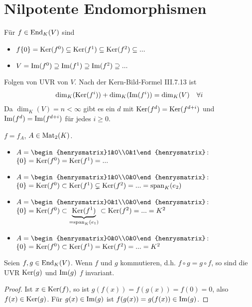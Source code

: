 \section{Nilpotente Endomorphismen}

\begin{remark}
	Für $f\in\operatorname{End}_K(V)$ sind 
	\begin{itemize}
		\item $f\{0\}=\operatorname{Ker}(f^0)\subseteq \operatorname{Ker}(f^1)\subseteq \operatorname{Ker}(f^2)\subseteq ...$
		\item $V=\operatorname{Im}(f^0)\supseteq \operatorname{Im}(f^1)\supseteq \operatorname{Im}(f^2)\supseteq ...$
	\end{itemize}
Folgen von UVR von $V$. Nach der Kern-Bild-Formel III.7.13 ist
\begin{align}
	\dim_K(\operatorname{Ker}(f^i))+\dim_K(\operatorname{Im}(f^i))=\dim_K(V)\quad\forall i\notag
\end{align}
Da $\dim_K(V)=n<\infty$ gibt es ein $d$ mit $\operatorname{Ker}(f^d)=\operatorname{Ker}(f^{d+i})$ und $\operatorname{Im}(f^d)=\operatorname{Im}(f^{d+i})$ für jedes $i\ge 0$.
\end{remark}

\begin{example}
	$f=f_A$, $A\in\operatorname{Mat}_2(K)$.
	\begin{itemize}
		\item $A=\begin{henrysmatrix}1&0\\0&1\end{henrysmatrix}$: $\{0\}=\operatorname{Ker}(f^0)=\operatorname{Ker}(f^1)=...$
		\item $A=\begin{henrysmatrix}1&0\\0&0\end{henrysmatrix}$: $\{0\}=\operatorname{Ker}(f^0)\subset\operatorname{Ker}(f^1)\subsetneq\operatorname{Ker}(f^2)=...=\operatorname{span}_K(e_2)$
		\item $A=\begin{henrysmatrix}0&1\\0&0\end{henrysmatrix}$: $\{0\}=\operatorname{Ker}(f^0)\subset\underbrace{\operatorname{Ker}(f^1)}_{=\operatorname{span}_K(e_1)}\subset \operatorname{Ker}(f^2)=... = K^2$
		\item $A=\begin{henrysmatrix}0&0\\0&0\end{henrysmatrix}$: $\{0\}=\operatorname{Ker}(f^0)\subset\operatorname{Ker}(f^1)=\operatorname{Ker}(f^2)=...=K^2$
	\end{itemize}
\end{example}

\begin{lemma}
	Seien $f,g\in\operatorname{End}_K(V)$. Wenn $f$ und  $g$ kommutieren, d.h. $f\circ g=g\circ f$, so sind die UVR $\operatorname{Ker}(g)$ und $\operatorname{Im}(g)$ $f$ invariant.
\end{lemma}
\begin{proof}
	Ist $x\in\operatorname{Ker}(f)$, so ist $g(f(x))=f(g(x))=f(0)=0$, also $f(x)\in\operatorname{Ker}(g)$. Für $g(x)\in\operatorname{Im}(g)$ ist $f(g(x))=g(f(x))\in\operatorname{Im}(g)$.
\end{proof}

